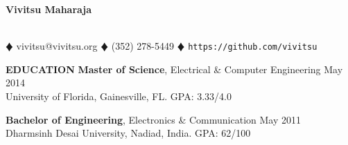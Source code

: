 \documentclass[10pt, letterpaper]{article}
\begin{document}
\begin{center}
\textbf{\Large Vivitsu Maharaja}
\date{}
\thispagestyle{empty}
\smallskip \\
$\vardiamond$ vivitsu@vivitsu.org $\vardiamond$ (352) 278-5449 $\vardiamond$ \texttt{https://github.com/vivitsu}
\end{center}

\textbf{EDUCATION}
\smallskip
\newline
{\bf Master of Science}, Electrical \& Computer Engineering \hfill May 2014\\
University of Florida, Gainesville, FL. \hfill GPA: 3.33/4.0

{\bf Bachelor of Engineering}, Electronics \& Communication \hfill May 2011\\
Dharmsinh Desai University, Nadiad, India. \hfill GPA: 62/100
\end{document}
